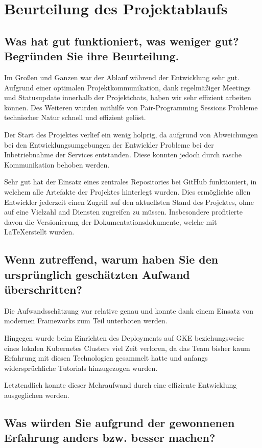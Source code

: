 \section{Beurteilung des Projektablaufs}

\subsection{Was hat gut funktioniert, was weniger gut? Begründen Sie ihre Beurteilung.}

Im Großen und Ganzen war der Ablauf während der Entwicklung sehr gut.
Aufgrund einer optimalen Projektkommunikation, dank regelmäßiger Meetings und Statusupdate innerhalb der Projektchats, haben wir sehr effizient arbeiten können.
Des Weiteren wurden mithilfe von Pair-Programming Sessions Probleme technischer Natur schnell und effizient gelöst.

Der Start des Projektes verlief ein wenig holprig, da aufgrund von Abweichungen bei den Entwicklungsumgebungen der Entwickler Probleme bei der Inbetriebnahme der Services entstanden.
Diese konnten jedoch durch rasche Kommunikation behoben werden.

Sehr gut hat der Einsatz eines zentrales Repositories bei GitHub funktioniert, in welchem alle Artefakte der Projektes hinterlegt wurden.
Dies ermöglichte allen Entwickler jederzeit einen Zugriff auf den aktuellsten Stand des Projektes, ohne auf eine Vielzahl and Diensten zugreifen zu müssen.
Insbesondere profitierte davon die Versionierung der Dokumentationsdokumente, welche mit \LaTeX \space erstellt wurden.

\subsection{Wenn zutreffend, warum haben Sie den ursprünglich geschätzten Aufwand überschritten?}

Die Aufwandsschätzung war relative genau und konnte dank einem Einsatz von modernen Frameworks zum Teil unterboten werden.

Hingegen wurde beim Einrichten des Deployments auf GKE beziehungsweise eines lokalen Kubernetes Clusters viel Zeit verloren, da das Team bisher kaum Erfahrung mit diesen Technologien gesammelt hatte und anfangs widersprüchliche Tutorials hinzugezogen wurden.

Letztendlich konnte dieser Mehraufwand durch eine effiziente Entwicklung ausgeglichen werden.

\subsection{Was würden Sie aufgrund der gewonnenen Erfahrung anders bzw. besser machen?}

